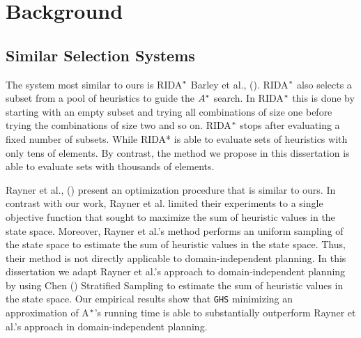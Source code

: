 
 
\chapter{Background}\label{ch:background}
\section{Similar Selection Systems}
\noindent
The system most similar to ours is RIDA$\sp{*}$ Barley et al., (\citeyear{BarleySantiagoOver}). RIDA$\sp{*}$ also selects a subset from a pool of heuristics to guide the $A\sp{*}$ search. In RIDA$\sp{*}$ this is done by starting with an empty subset and trying all combinations of size one before trying the combinations of size two and so on. RIDA$\sp{*}$ stops after evaluating a fixed number of subsets. While RIDA* is able to evaluate sets of heuristics with only tens of elements. By contrast, the method we propose in this dissertation is able to evaluate sets with thousands of elements.

Rayner et al., (\citeyear{raynersss13}) present an optimization procedure that is similar to ours. In contrast with our work, Rayner et al. limited their experiments to a single objective function that sought to maximize the sum of heuristic values in the state space. Moreover, Rayner et al.'s method performs an uniform sampling of the state space to estimate the sum of heuristic values in the state space. Thus, their method is not directly applicable to domain-independent planning. In this dissertation we adapt Rayner et al.'s approach to domain-independent planning by using Chen (\citeyear{chen1992heuristic}) Stratified Sampling to estimate the sum of heuristic values in the state space. Our empirical results show that \texttt{GHS} minimizing an approximation of A$\sp{*}$'s running time is able to substantially outperform Rayner et al.'s approach in domain-independent planning. 

